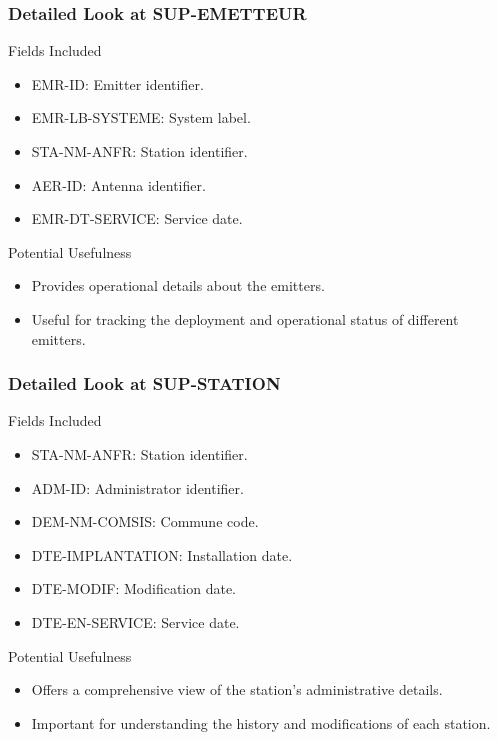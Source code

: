 \begin{frame}
    \frametitle{Detailed Look at SUP-EMETTEUR}
    \begin{block}{Fields Included}
        \begin{itemize}
            \item EMR-ID: Emitter identifier.
            \item EMR-LB-SYSTEME: System label.
            \item STA-NM-ANFR: Station identifier.
            \item AER-ID: Antenna identifier.
            \item EMR-DT-SERVICE: Service date.
        \end{itemize}
    \end{block}
        
    \begin{block}{Potential Usefulness}    
        \begin{itemize}
            \item Provides operational details about the emitters.
            \item Useful for tracking the deployment and operational status of different emitters.
        \end{itemize}
    \end{block}
\end{frame}

\begin{frame}
    \frametitle{Detailed Look at SUP-STATION}
    \begin{block}{Fields Included}
        \begin{itemize}
            \item STA-NM-ANFR: Station identifier.
            \item ADM-ID: Administrator identifier.
            \item DEM-NM-COMSIS: Commune code.
            \item DTE-IMPLANTATION: Installation date.
            \item DTE-MODIF: Modification date.
            \item DTE-EN-SERVICE: Service date.
        \end{itemize}
    \end{block}
    \begin{block}{Potential Usefulness}
        \begin{itemize}
            \item Offers a comprehensive view of the station's administrative details.
            \item Important for understanding the history and modifications of each station.
        \end{itemize}
    \end{block}
\end{frame}
    
